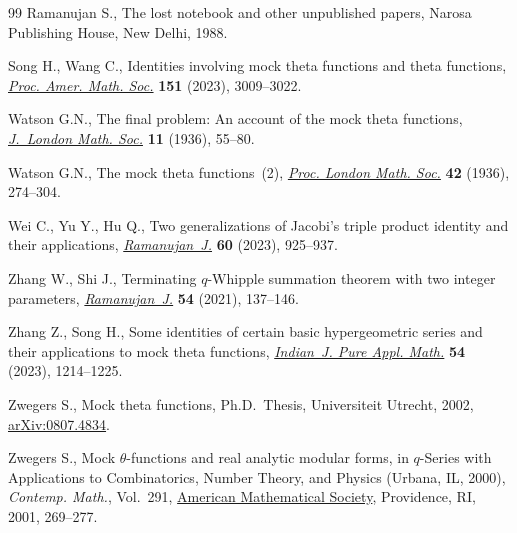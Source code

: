 \begin{thebibliography}{99}
Ramanujan S., The lost notebook and other unpublished papers, Narosa Publishing
  House, New Delhi, 1988.

Song H., Wang C., Identities involving mock theta functions and theta
  functions, \href{https://doi.org/10.1090/proc/16343}{\textit{Proc. Amer.
  Math. Soc.}} \textbf{151} (2023), 3009--3022.

Watson G.N., The final problem: {A}n account of the mock theta functions,
  \href{https://doi.org/10.1112/jlms/s1-11.1.55}{\textit{J.~London Math. Soc.}}
  \textbf{11} (1936), 55--80.

Watson G.N., The mock theta functions~(2),
  \href{https://doi.org/10.1112/plms/s2-42.1.274}{\textit{Proc. London Math.
  Soc.}} \textbf{42} (1936), 274--304.

Wei C., Yu Y., Hu Q., Two generalizations of {J}acobi's triple product identity
  and their applications,
  \href{https://doi.org/10.1007/s11139-022-00640-x}{\textit{Ramanujan~J.}}
  \textbf{60} (2023), 925--937.

Zhang W., Shi J., Terminating {$q$}-{W}hipple summation theorem with two
  integer parameters,
  \href{https://doi.org/10.1007/s11139-019-00208-2}{\textit{Ramanujan~J.}}
  \textbf{54} (2021), 137--146.

Zhang Z., Song H., Some identities of certain basic hypergeometric series and
  their applications to mock theta functions,
  \href{https://doi.org/10.1007/s13226-022-00335-5}{\textit{Indian~J. Pure
  Appl. Math.}} \textbf{54} (2023), 1214--1225.

Zwegers S., Mock theta functions, Ph.D.~Thesis, {U}niversiteit Utrecht, 2002,
  \href{http://arxiv.org/abs/0807.4834}{arXiv:0807.4834}.

Zwegers S., Mock {$\theta$}-functions and real analytic modular forms, in
  {$q$}-{S}eries with {A}pplications to {C}ombinatorics, {N}umber {T}heory, and
  {P}hysics ({U}rbana, {IL}, 2000), \textit{Contemp. Math.}, Vol.~291,
  \href{https://doi.org/10.1090/conm/291/04907}{American Mathematical Society},
  Providence, RI, 2001, 269--277.

\end{thebibliography}

